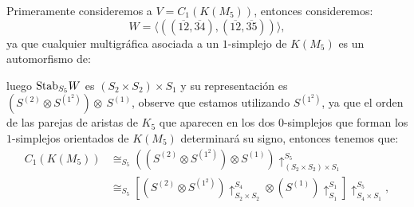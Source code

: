 \documentclass[12pt]{book}
\theoremstyle{definition}
\newcounter{in}
\begin{document}
Primeramente consideremos a $V = C_{1}(K(M_5))$, entonces
consideremos:
\begin{equation}
W = \langle ((\overline{12},\overline{34}), (\overline{12},\overline{35})) \rangle,
\end{equation}
ya que cualquier multigráfica asociada a un $1$-simplejo de $K(M_{5})$
es un automorfismo de:
%
\begin{center}
\end{center}
luego $\textup{Stab}_{S_{5}} W$ es $(S_{2} \times S_{2}) \times S_{1}$ y su representación es $(S^{(2)} \otimes S^{(1^{2})}) \otimes~S^{(1)}$, observe que estamos utilizando $S^{(1^{2})}$, ya que el orden de las parejas de aristas de $K_{5}$ que aparecen en los dos $0$-simplejos que forman los $1$-simplejos orientados de $K(M_{5})$ determinará su signo, entonces tenemos que:
\begin{equation}
\begin{aligned}
C_{1}(K(M_{5})) & \cong_{S_{5}} ((S^{(2)} \otimes S^{(1^{2})}) \otimes S^{(1)})\uparrow_{(S_{2} \times S_{2}) \times S_{1}}^{S_{5}} \\
& \cong_{S_{5}} \left [ (S^{(2)} \otimes S^{(1^{2})})\uparrow_{S_{2} \times S_{2}}^{S_{4}} \otimes (S^{(1)})\uparrow_{S_{1}}^{S_{1}} \right ] \uparrow_{S_{4} \times S_{1}}^{S_{5}},
\end{aligned}
\end{equation}
\end{document}
